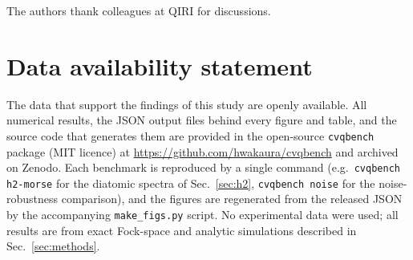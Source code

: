 \documentclass[12pt]{iopart}
\begin{document}
\ack
The authors thank colleagues at QIRI for discussions.

\section*{Data availability statement}
The data that support the findings of this study are openly available. All
numerical results, the JSON output files behind every figure and table, and
the source code that generates them are provided in the open-source
\texttt{cvqbench} package (MIT licence) at
\url{https://github.com/hwakaura/cvqbench} and archived on Zenodo. Each
benchmark is reproduced by a single command (e.g.\ \texttt{cvqbench h2-morse}
for the diatomic spectra of Sec.~\ref{sec:h2}, \texttt{cvqbench noise} for the
noise-robustness comparison), and the figures are regenerated from the
released JSON by the accompanying \texttt{make\_figs.py} script. No
experimental data were used; all results are from exact Fock-space and
analytic simulations described in Sec.~\ref{sec:methods}.
\end{document}
